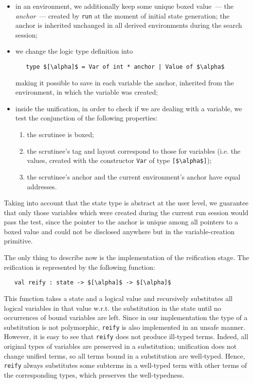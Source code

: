 \begin{itemize}
\item in an environment, we additionally keep some unique boxed value~--- the \emph{anchor}~--- created by \lstinline{run} at the moment of initial
state generation; the anchor is inherited unchanged in all derived environments during the search session;
\item we change the logic type definition into

\begin{lstlisting}
   type $[\alpha]$ = Var of int * anchor | Value of $\alpha$
\end{lstlisting}

\noindent making it possible to save in each variable the anchor, inherited from the environment, in which the variable was created;

\item inside the unification, in order to check if we are dealing with a variable, we test the conjunction of the following properties:

  \begin{enumerate}
    \item the scrutinee is boxed;
    \item the scrutinee's tag and layout correspond to those for variables (i.e. the values, created with the constructor \lstinline{Var} of
type \lstinline{[$\alpha$]});
    \item the scrutinee's anchor and the current environment's anchor have equal addresses.
  \end{enumerate}
\end{itemize}

Taking into account that the state type is abstract at the user level, we guarantee that only those variables which were
created during the current run session would pass the test, since the pointer to the anchor is unique among all pointers to a boxed value
and could not be disclosed anywhere but in the variable-creation primitive.

The only thing to describe now is the implementation of the reification stage. The reification is represented by the following
function:

\begin{lstlisting}
   val reify : state -> $[\alpha]$ -> $[\alpha]$
\end{lstlisting}

This function takes a state and a logical value and recursively substitutes all logical variables in that value w.r.t.
the substitution in the state until no occurrences of bound variables are left. Since in our implementation the type of a substitution is
not polymorphic, \lstinline{reify} is also implemented in an unsafe manner. However, it is easy to see that \lstinline{reify}
does not produce ill-typed terms. Indeed, all original types of variables are preserved in a substitution; unification does not
change unified terms, so all terms bound in a substitution are well-typed. Hence, \lstinline{reify} always substitutes
some subterms in a well-typed term with other terms of the corresponding types, which preserves the well-typedness.

